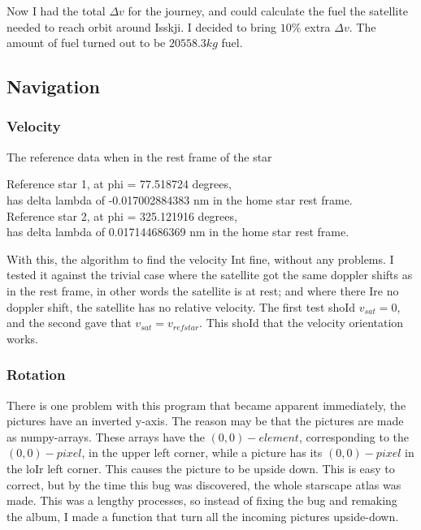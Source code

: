 \documentclass[a4paper, 10pt]{article}
\begin{document}
Now I had the total $\Delta v$ for the journey, and could calculate the fuel the satellite needed to reach orbit around Isskji. I decided to bring $10 \%$ extra $\Delta v$. The amount of fuel turned out to be $20558.3 kg$ fuel. 


\subsection{Navigation}

\subsubsection{Velocity}

The reference data when in the rest frame of the star

\begin{tcolorbox}
Reference star 1, at phi = 77.518724 degrees, \\
has delta lambda of  -0.017002884383 nm in the home star rest frame. \\
Reference star 2, at phi = 325.121916 degrees, \\
has delta lambda of   0.017144686369 nm in the home star rest frame. 
\end{tcolorbox}

With this, the algorithm to find the velocity Int fine, without any problems. I tested it against the trivial case where the satellite got the same doppler shifts as in the rest frame, in other words  the satellite is at rest; and where there Ire no doppler shift, the satellite has no relative velocity. The first test shoId $v_{sat} = 0$, and the second gave that $v_{sat} = v_{refstar}$. This shoId that the velocity orientation works.

\subsubsection{Rotation}

There is one problem with this program that became apparent immediately, the pictures have an inverted y-axis. The reason may be that the pictures are made as numpy-arrays. These arrays have the $(0,0)-element$, corresponding to the $(0,0)-pixel$, in the upper left corner, while a picture has its $(0,0)-pixel$ in the loIr left corner. This causes the picture to be upside down. This is easy to correct, but by the time this bug was discovered, the whole starscape atlas was made. This was a lengthy processes, so instead of fixing the bug and remaking the album, I made a function that turn all the incoming pictures upside-down.\\
\end{document}
